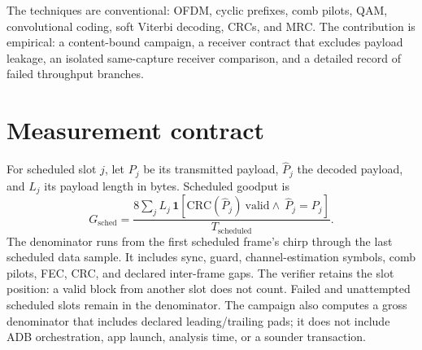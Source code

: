 \documentclass[11pt]{article}
\begin{document}
The techniques are conventional: OFDM, cyclic prefixes, comb pilots, QAM,
convolutional coding, soft Viterbi decoding, CRCs, and MRC. The contribution is
empirical: a content-bound campaign, a receiver contract that excludes payload
leakage, an isolated same-capture receiver comparison, and a detailed record
of failed throughput branches.

\begin{center}
\end{center}

\section{Measurement contract}
\label{sec:contract}

For scheduled slot $j$, let $P_j$ be its transmitted payload, $\hat P_j$ the
decoded payload, and $L_j$ its payload length in bytes. Scheduled goodput is
\begin{equation}
  G_{\mathrm{sched}} =
  \frac{8\sum_j L_j\,\mathbf{1}[\mathrm{CRC}(\hat P_j)\ \mathrm{valid}
    \land\ \hat P_j=P_j]}{T_{\mathrm{scheduled}}}.
\end{equation}
The denominator runs from the first scheduled frame's chirp through the last
scheduled data sample. It includes sync, guard, channel-estimation symbols,
comb pilots, FEC, CRC, and declared inter-frame gaps. The verifier retains the
slot position: a valid block from another slot does not count. Failed and
unattempted scheduled slots remain in the denominator. The campaign also
computes a gross denominator that includes declared leading/trailing pads; it
does not include ADB orchestration, app launch, analysis time, or a sounder
transaction.
\end{document}
